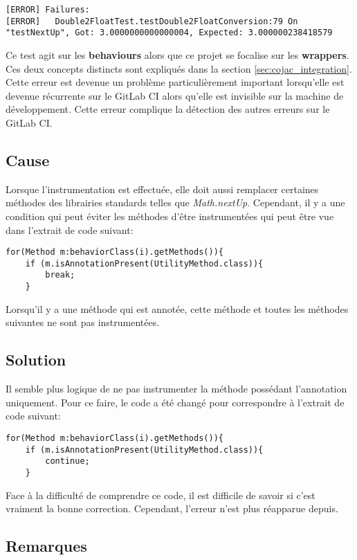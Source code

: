 \begin{verbatim}
[ERROR] Failures: 
[ERROR]   Double2FloatTest.testDouble2FloatConversion:79 On "testNextUp", Got: 3.0000000000000004, Expected: 3.000000238418579
\end{verbatim}

Ce test agit sur les \textbf{behaviours} alors que ce projet se focalise sur les \textbf{wrappers}. Ces deux concepts distincts sont expliqués dans la section \ref{sec:cojac_integration}. Cette erreur est devenue un problème particulièrement important lorsqu'elle est devenue récurrente sur le GitLab CI alors qu'elle est invisible sur la machine de développement. Cette erreur complique la détection des autres erreurs sur le GitLab CI.

\subsection{Cause}

Lorsque l'instrumentation est effectuée, elle doit aussi remplacer certaines méthodes des librairies standards telles que \textit{Math.nextUp}. Cependant, il y a une condition qui peut éviter les méthodes d'être instrumentées qui peut être vue dans l'extrait de code suivant:
\begin{verbatim}
for(Method m:behaviorClass(i).getMethods()){
    if (m.isAnnotationPresent(UtilityMethod.class)){
        break;
    }
\end{verbatim}
Lorsqu'il y a une méthode qui est annotée, cette méthode et toutes les méthodes suivantes ne sont pas instrumentées.

\subsection{Solution}

Il semble plus logique de ne pas instrumenter la méthode possédant l'annotation uniquement. Pour ce faire, le code a été changé pour correspondre à l'extrait de code suivant:
\begin{verbatim}
for(Method m:behaviorClass(i).getMethods()){
    if (m.isAnnotationPresent(UtilityMethod.class)){
        continue;
    }
\end{verbatim}

Face à la difficulté de comprendre ce code, il est difficile de savoir si c'est vraiment la bonne correction. Cependant, l'erreur n'est plus réapparue depuis.

\subsection{Remarques}

